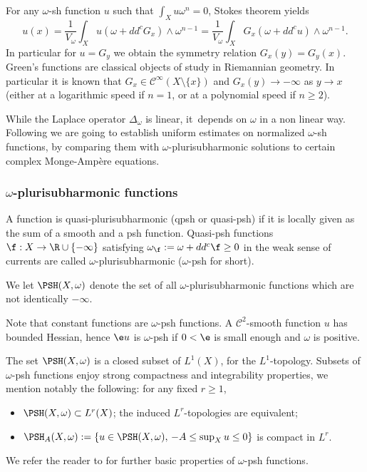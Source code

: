For any $\omega$-sh function $u$ such that $\int_X u \omega^n=0$, Stokes theorem yields
\[
u(x)=\frac{1}{V_{\omega}} \int_X u(\omega+dd^c G_x) \wedge \omega^{n-1}=\frac{1}{V_{\omega}} \int_X G_x (\omega+dd^c u) \wedge \omega^{n-1}.
\]
In particular for $u=G_y$ we obtain the symmetry relation $G_x(y)=G_y(x)$.
Green's functions are classical objects of study in Riemannian geometry. In particular it is known
that $G_x \in {\mathcal C}^{\infty}(X \setminus \{x \})$ and $G_x(y) \rightarrow -\infty$ as
$y \rightarrow x$ (either at a logarithmic speed if $n=1$, or at a polynomial speed if $n \geq 2$).

While the Laplace operator $\Delta_{\omega}$ is linear, it~depends on $\omega$ in a non linear way.
Following \cite{GPS22,GPSS22,GPSS23} we are going to establish uniform estimates on normalized
$\omega$-sh functions, by comparing them with $\omega$-plurisubharmonic solutions to certain complex Monge-Ampère equations.

\subsubsection{$\omega$-plurisubharmonic functions}

A function is quasi-plurisub\-harmonic (qpsh or quasi-psh) if it is locally given as the sum of a smooth and a psh function.
Quasi-psh functions
$\f:X \rightarrow \R \cup \{-\infty\}$ satisfying
$
\omega_{\f}:=\omega+dd^c \f \geq 0
$
in the weak sense of currents are called $\omega$-plurisubharmonic ($\omega$-psh for short).

\begin{defi}
We let $\PSH(X,\omega)$ denote the set of all $\omega$-plurisubharmonic functions which are not identically $-\infty$.
\end{defi}

Note that constant functions are $\omega$-psh functions.
A ${\mathcal C}^2$-smooth function $u$ has bounded Hessian, hence $\e u$ is
$\omega$-psh if $0<\e$ is small enough and $\omega$ is positive.

The set $\PSH(X,\omega)$ is a closed subset of $L^1(X)$, for the $L^1$-topology.
Subsets of $\omega$-psh functions enjoy strong compactness and integrability properties,
we mention notably the following: for any fixed $r \geq 1$,
\begin{itemize}
\item $\PSH(X,\omega) \subset L^r(X)$;
the induced $L^r$-topologies are equivalent;
\item $\PSH_A(X,\omega):=\{ u \in\PSH(X,\omega), \, -A \leq \sup_X u \leq 0 \}$ is compact in $L^r$.
\end{itemize}
We refer the reader to \cite{Dem12,GZbook} for further basic properties of $\omega$-psh functions.

